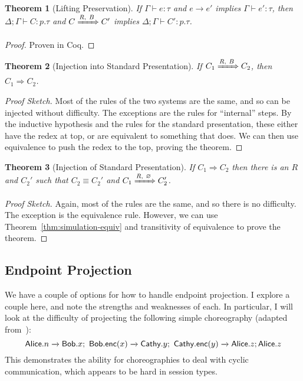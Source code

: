 \documentclass{article}
\newtheorem{thm}{Theorem}
\theoremstyle{definition}
\newcommand{\To}{\Rightarrow}
\newcommand{\ceq}{\equiv}
\newcommand{\own}[2]{#1.#2}
\newcommand{\send}[3][]{#2\nolinebreak \mathrel{\xrightarrow{#1}}\nolinebreak #3}
\newcommand{\proves}{\vdash}
\begin{document}
\begin{thm}[Lifting Preservation]
  \label{thm:lifting-preservation}
  If $\Gamma \proves e : \tau$ and $e \to e'$ implies $\Gamma \proves e' : \tau$, then $\Delta; \Gamma \proves C : p.\tau$ and $C \xRightarrow{R,~B} C'$ implies $\Delta; \Gamma \proves C' : p.\tau$.
\end{thm}
\begin{proof}
  Proven in Coq.
\end{proof}

\begin{thm}[Injection into Standard Presentation]
  If $C_1 \xRightarrow{R,~B} C_2$, then $C_1 \To C_2$.
\end{thm}
\begin{proof}[Proof Sketch]
  Most of the rules of the two systems are the same, and so can be injected without difficulty.
  The exceptions are the rules for ``internal'' steps.
  By the inductive hypothesis and the rules for the standard presentation, these either have the redex at top, or are equivalent to something that does.
  We can then use equivalence to push the redex to the top, proving the theorem.
\end{proof}

\begin{thm}[Injection of Standard Presentation]
  If $C_1 \To C_2$ then there is an $R$ and $C_2'$ such that $C_2 \ceq C_2'$ and $C_1 \xRightarrow{R,~\varnothing} C_2'$.
\end{thm}
\begin{proof}[Proof Sketch]
  Again, most of the rules are the same, and so there is no difficulty.
  The exception is the equivalence rule.
  However, we can use Theorem~\ref{thm:simulation-equiv} and transitivity of equivalence to prove the theorem.
\end{proof}


\subsection{Endpoint Projection}

We have a couple of options for how to handle endpoint projection.
I explore a couple here, and note the strengths and weaknesses of each.
In particular, I will look at the difficulty of projecting the following simple choreography (adapted from~\citet{AschieriG20}):
$$\send{\own{\textsf{Alice}}{n}}{\own{\textsf{Bob}}{x}};~\send{\own{\textsf{Bob}}{\textsf{enc}(x)}}{\own{\textsf{Cathy}}{y}};~\send{\own{\textsf{Cathy}}{\textsf{enc}(y)}}{\own{\textsf{Alice}}{z}}; \own{\textsf{Alice}}{z}$$
This demonstrates the ability for choreographies to deal with cyclic communication, which appears to be hard in session types.
\end{document}
